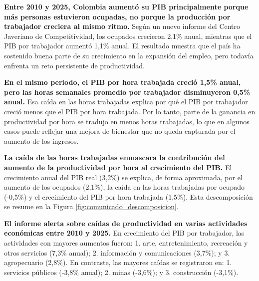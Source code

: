 \documentclass[11pt, a4paper]{article}
\begin{document}
\textbf{Entre 2010 y 2025, Colombia aumentó su PIB principalmente porque más personas estuvieron ocupadas, no porque la producción por trabajador creciera al mismo ritmo.} Según un nuevo informe del Centro Javeriano de Competitividad, los ocupados crecieron 2,1\% anual, mientras que el PIB por trabajador aumentó 1,1\% anual. El resultado muestra que el país ha sostenido buena parte de su crecimiento en la expansión del empleo, pero todavía enfrenta un reto persistente de productividad.



\textbf{En el mismo periodo, el PIB por hora trabajada creció 1,5\% anual, pero las horas semanales promedio por trabajador disminuyeron 0,5\% anual.} Esa caída en las horas trabajadas explica por qué el PIB por trabajador creció menos que el PIB por hora trabajada. Por lo tanto, parte de la ganancia en productividad por hora se tradujo en menos horas trabajadas, lo que en algunos casos puede reflejar una mejora de bienestar que no queda capturada por el aumento de los ingresos.

\textbf{La caída de las horas trabajadas enmascara la contribución del aumento de la productividad por hora al crecimiento del PIB.} El crecimiento anual del PIB real (3,2\%) se explica, de forma aproximada, por el aumento de los ocupados (2,1\%), la caída en las horas trabajadas por ocupado (-0,5\%) y el crecimiento del PIB por hora trabajada (1,5\%). Esta descomposición se resume en la Figura \ref{fig:comunicado_descomposicion}.

\textbf{El informe alerta sobre caídas de productividad en varias actividades económicas entre 2010 y 2025.} En crecimiento del PIB por trabajador, las actividades con mayores aumentos fueron: 1. arte, entretenimiento, recreación y otros servicios (7,3\% anual); 2. información y comunicaciones (3,7\%); y 3. agropecuario (2,8\%). En contraste, las mayores caídas se registraron en: 1. servicios públicos (-3,8\% anual); 2. minas (-3,6\%); y 3. construcción (-3,1\%). 
\end{document}
